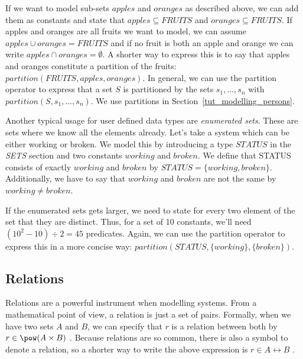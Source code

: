 
If we want to model sub-sets $apples$ and $oranges$ as described above, we can add them as
constants and state that $apples \subseteq FRUITS$ and $oranges \subseteq FRUITS$.
If apples and oranges are all fruits we want to model, we can assume $apples \cup oranges = FRUITS$
and if no fruit is both an apple and orange we can write $apples \cap oranges = \emptyset$.
A shorter way to express this is to say that apples and oranges constitute a
partition of the fruits: $partition(FRUITS,apples,oranges)$.
In general, we can use the partition operator to express that a set $S$ is partitioned by the
sets $s_1,\ldots,s_n$ with $partition(S,s_1,\ldots,s_n)$.  We use partitions in Section~\ref{tut_modelling_persons}.

Another typical usage for user defined data types are \emph{enumerated sets}.
These are sets where we know all the elements already. Let's take a system which can be either working or broken.
We model this by introducing a type $STATUS$ in the \textsl{SETS} section and two constants
$working$ and $broken$.
We define that STATUS consists of exactly $working$ and $broken$ by $STATUS = \{working,broken\}$.
Additionally, we have to say that $working$ and $broken$ are not the same by $working \neq broken$.

If the enumerated sets gets larger, we need to state for every two element of the set that they are
distinct. Thus, for a set of 10 constants, we'll need $(10^2-10)\div 2 = 45$ predicates.
Again, we can use the partition operator to express this in a more concise way: $partition(STATUS,\{working\},\{broken\})$.

\subsection{Relations}
\label{tut_relations}
Relations are a powerful instrument when modelling systems. From a mathematical point of view, a
relation is just a set of pairs. Formally, when we have two sets $A$ and $B$, we can specify that
$r$ is a relation between both by $r \in \pow(A\cprod B)$ .
Because relations are so common, there is also a symbol to denote a relation, so a shorter way to write the above expression is $r \in A\rel B$ .


